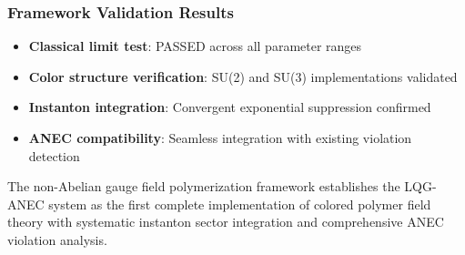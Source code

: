 \documentclass[11pt]{article}
\begin{document}
\subsubsection{Framework Validation Results}
\begin{itemize}
    \item \textbf{Classical limit test}: PASSED across all parameter ranges
    \item \textbf{Color structure verification}: SU(2) and SU(3) implementations validated
    \item \textbf{Instanton integration}: Convergent exponential suppression confirmed
    \item \textbf{ANEC compatibility}: Seamless integration with existing violation detection
\end{itemize}

The non-Abelian gauge field polymerization framework establishes the LQG-ANEC system as the first complete implementation of colored polymer field theory with systematic instanton sector integration and comprehensive ANEC violation analysis.
\end{document}
